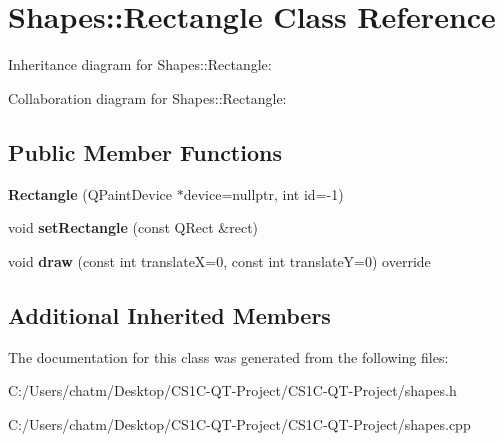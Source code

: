 \hypertarget{class_shapes_1_1_rectangle}{}\section{Shapes\+::Rectangle Class Reference}
\label{class_shapes_1_1_rectangle}


Inheritance diagram for Shapes\+::Rectangle\+:


Collaboration diagram for Shapes\+::Rectangle\+:
\subsection*{Public Member Functions}
\begin{DoxyCompactItemize}
\item 
\mbox{\label{class_shapes_1_1_rectangle_a8aca5499a650cda9705028204ecba3e9}} 
{\bfseries Rectangle} (Q\+Paint\+Device $\ast$device=nullptr, int id=-\/1)
\item 
\mbox{\label{class_shapes_1_1_rectangle_ab643181d81bdbecc6fe37c783e48a576}} 
void {\bfseries set\+Rectangle} (const Q\+Rect \&rect)
\item 
\mbox{\label{class_shapes_1_1_rectangle_a0765c01fcbc95b43ebc7d5358bf24d17}} 
void {\bfseries draw} (const int translateX=0, const int translateY=0) override
\end{DoxyCompactItemize}
\subsection*{Additional Inherited Members}


The documentation for this class was generated from the following files\+:\begin{DoxyCompactItemize}
\item 
C\+:/\+Users/chatm/\+Desktop/\+C\+S1\+C-\/\+Q\+T-\/\+Project/\+C\+S1\+C-\/\+Q\+T-\/\+Project/shapes.\+h\item 
C\+:/\+Users/chatm/\+Desktop/\+C\+S1\+C-\/\+Q\+T-\/\+Project/\+C\+S1\+C-\/\+Q\+T-\/\+Project/shapes.\+cpp\end{DoxyCompactItemize}
